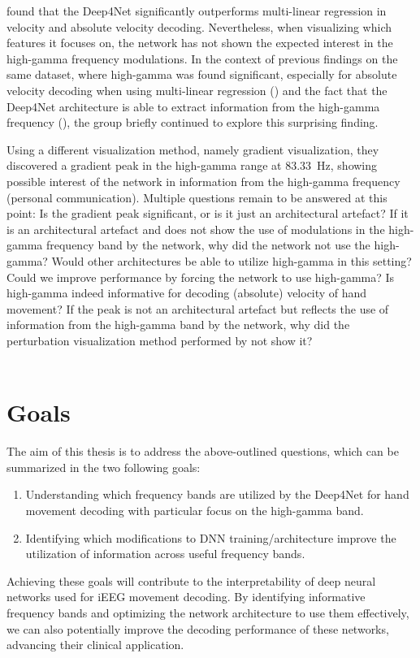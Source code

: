 \cite{Hammer-2021} found that the Deep4Net significantly outperforms multi-linear regression in velocity and absolute velocity decoding.
Nevertheless, when visualizing which features it focuses on, the network has not shown the expected interest in the high-gamma frequency modulations. 
In the context of previous findings on the same dataset, where high-gamma was found significant, especially for absolute velocity decoding when using multi-linear regression (\cite{hammer-predominance-2016}) and the fact that the Deep4Net architecture is able to extract information from the high-gamma frequency (\cite{schirrmeister-deep-2017}), the group briefly continued to explore this surprising finding.

Using a different visualization method, namely gradient visualization, they discovered a gradient peak in the high-gamma range at 83.33~Hz, showing possible interest of the network in information from the high-gamma frequency (personal communication).
Multiple questions remain to be answered at this point: Is the gradient peak significant, or is it just an architectural artefact?
If it is an architectural artefact and does not show the use of modulations in the high-gamma frequency band by the network, why did the network not use the high-gamma?
Would other architectures be able to utilize high-gamma in this setting?
Could we improve performance by forcing the network to use high-gamma?
Is high-gamma indeed informative for decoding (absolute) velocity of hand movement? 
If the peak is not an architectural artefact but reflects the use of information from the high-gamma band by the network, why did the perturbation visualization method performed by \cite{Hammer-2021} not show it?\\
\\


\section*{Goals}
The aim of this thesis is to address the above-outlined questions, which can be summarized in the two following goals:

\begin{enumerate}
    \item Understanding which frequency bands are utilized by the Deep4Net for hand movement decoding with particular focus on the high-gamma band. 
    \item Identifying which modifications to DNN training/architecture improve the utilization of information across useful frequency bands.
\end{enumerate}

Achieving these goals will contribute to the interpretability of deep neural networks used for iEEG movement decoding.
By identifying informative frequency bands and optimizing the network architecture to use them effectively, we can also potentially improve the decoding performance of these networks, advancing their clinical application.
